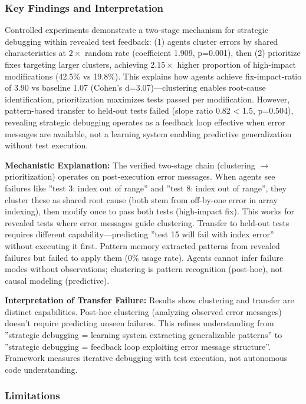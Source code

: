 
\subsubsection{Key Findings and Interpretation}

Controlled experiments demonstrate a two-stage mechanism for strategic debugging within revealed test feedback: (1) agents cluster errors by shared characteristics at $2\times$ random rate (coefficient 1.909, p=0.001), then (2) prioritize fixes targeting larger clusters, achieving 2.$15\times$ higher proportion of high-impact modifications (42.5\% vs 19.8\%). This explains how agents achieve fix-impact-ratio of 3.90 vs baseline 1.07 (Cohen's d=3.07)---clustering enables root-cause identification, prioritization maximizes tests passed per modification. However, pattern-based transfer to held-out tests failed (slope ratio 0.82 < 1.5, p=0.504), revealing strategic debugging operates as a feedback loop effective when error messages are available, not a learning system enabling predictive generalization without test execution.

\textbf{Mechanistic Explanation:} The verified two-stage chain (clustering $\rightarrow$ prioritization) operates on post-execution error messages. When agents see failures like ''test 3: index out of range'' and ''test 8: index out of range'', they cluster these as shared root cause (both stem from off-by-one error in array indexing), then modify once to pass both tests (high-impact fix). This works for revealed tests where error messages guide clustering. Transfer to held-out tests requires different capability---predicting ''test 15 will fail with index error'' without executing it first. Pattern memory extracted patterns from revealed failures but failed to apply them (0\% usage rate). Agents cannot infer failure modes without observations; clustering is pattern recognition (post-hoc), not causal modeling (predictive).

\textbf{Interpretation of Transfer Failure:} Results show clustering and transfer are distinct capabilities. Post-hoc clustering (analyzing observed error messages) doesn't require predicting unseen failures. This refines understanding from ''strategic debugging = learning system extracting generalizable patterns'' to ''strategic debugging = feedback loop exploiting error message structure''. Framework measures iterative debugging with test execution, not autonomous code understanding.

\subsubsection{Limitations}

